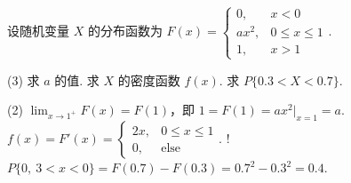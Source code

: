 \begin{problem}[本题10分]
  设随机变量 $X$ 的分布函数为 $F(x) =
  \begin{cases}
    0,    & x < 0\\
    ax^2, & 0 \leq x \leq 1\\
    1,    & x > 1
  \end{cases}$.
  \begin{tasks}[ label = \arabic*. ](3)
    \task 求 $a$ 的值.
    \task 求 $X$ 的密度函数 $f(x)$.
    \task 求 $P\{0.3 < X < 0.7\}$.
  \end{tasks}
\end{problem}
\begin{solution}\leavevmode
  \begin{tasks}[ label = \arabic*. ](2)
    \task $\lim_{x \to 1^+} F(x) = F(1)$，即 $1 = F(1) = ax^2|_{x = 1} = a$.
    \task $f(x) = F'(x) =
    \begin{cases}
      2x, & 0 \leq x \leq 1\\
      0,  & \text{else}
    \end{cases}$.
    \task! $P\{0,~ 3 < x < 0\} = F(0.7) - F(0.3) = 0.7^2 - 0.3^2 = 0.4$.
  \end{tasks}
\end{solution}

